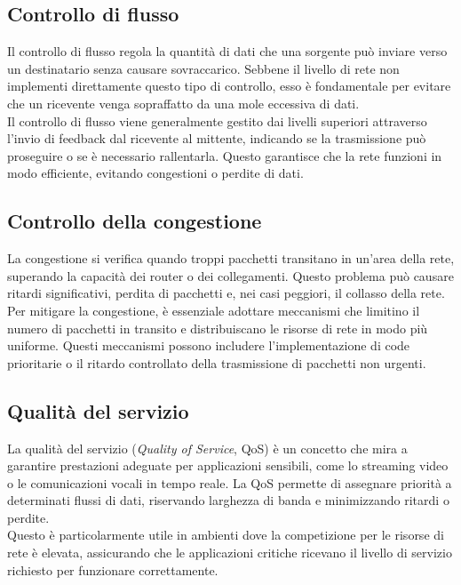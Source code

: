 \documentclass[12pt]{report}
\begin{document}
	\subsection{Controllo di flusso}
	Il controllo di flusso regola la quantità di dati che una sorgente può inviare verso un destinatario senza causare sovraccarico. Sebbene il livello di rete non implementi direttamente questo tipo di controllo, esso è fondamentale per evitare che un ricevente venga sopraffatto da una mole eccessiva di dati.
	\vspace{\baselineskip}\\
	Il controllo di flusso viene generalmente gestito dai livelli superiori attraverso l'invio di feedback dal ricevente al mittente, indicando se la trasmissione può proseguire o se è necessario rallentarla. Questo garantisce che la rete funzioni in modo efficiente, evitando congestioni o perdite di dati.
	
	\subsection{Controllo della congestione}
	La congestione si verifica quando troppi pacchetti transitano in un'area della rete, superando la capacità dei router o dei collegamenti. Questo problema può causare ritardi significativi, perdita di pacchetti e, nei casi peggiori, il collasso della rete.
	\vspace{\baselineskip}\\
	Per mitigare la congestione, è essenziale adottare meccanismi che limitino il numero di pacchetti in transito e distribuiscano le risorse di rete in modo più uniforme. Questi meccanismi possono includere l'implementazione di code prioritarie o il ritardo controllato della trasmissione di pacchetti non urgenti.
	
	\subsection{Qualità del servizio}
	La qualità del servizio (\textit{Quality of Service}, QoS) è un concetto che mira a garantire prestazioni adeguate per applicazioni sensibili, come lo streaming video o le comunicazioni vocali in tempo reale. La QoS permette di assegnare priorità a determinati flussi di dati, riservando larghezza di banda e minimizzando ritardi o perdite.
	\vspace{\baselineskip}\\
	Questo è particolarmente utile in ambienti dove la competizione per le risorse di rete è elevata, assicurando che le applicazioni critiche ricevano il livello di servizio richiesto per funzionare correttamente.
	
\end{document}
